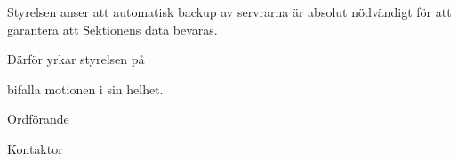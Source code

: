 \documentclass[../_main/handlingar.tex]{subfiles}
\begin{document}
\motionssvar

Styrelsen anser att automatisk backup av servrarna är absolut nödvändigt för att garantera att Sektionens data bevaras.

Därför yrkar styrelsen på
\begin{attsatser}
    \att bifalla motionen i sin helhet.
\end{attsatser}

\begin{signatures}{2}
    \ist
    \signature{\ordf}{Ordförande}
    \signature{Erik Månsson}{Kontaktor}
\end{signatures}
\end{document}
